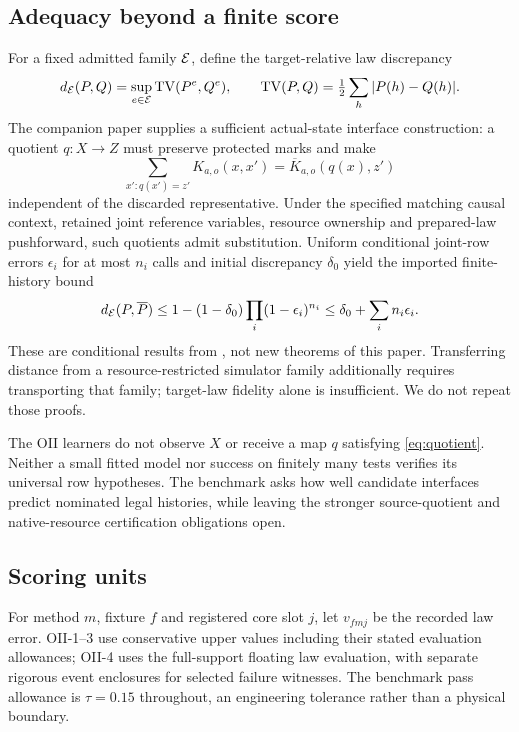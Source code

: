 \subsection{Adequacy beyond a finite score}
For a fixed admitted family $\mathcal E$, define the target-relative law discrepancy
\begin{equation}
 d_{\mathcal E}(P,Q)=\sup_{e\in\mathcal E}\operatorname{TV}(P^e,Q^e),\qquad
 \operatorname{TV}(P,Q)=\tfrac12\sum_h|P(h)-Q(h)|.
 \label{eq:legalrisk}
\end{equation}
The companion paper supplies a sufficient actual-state interface construction: a quotient $q:X\to Z$ must preserve protected marks and make
\begin{equation}
 \sum_{x':q(x')=z'}K_{a,o}(x,x')
 =\overline K_{a,o}(q(x),z')
 \label{eq:quotient}
\end{equation}
independent of the discarded representative. Under the specified matching causal context, retained joint reference variables, resource ownership and prepared-law pushforward, such quotients admit substitution. Uniform conditional joint-row errors $\epsilon_i$ for at most $n_i$ calls and initial discrepancy $\delta_0$ yield the imported finite-history bound
\begin{equation}
 d_{\mathcal E}(P,\overline P)\leq
 1-(1-\delta_0)\prod_i(1-\epsilon_i)^{n_i}
 \leq\delta_0+\sum_i n_i\epsilon_i.
 \label{eq:importbound}
\end{equation}
These are conditional results from \cite{RodgersPaper2}, not new theorems of this paper. Transferring distance from a resource-restricted simulator family additionally requires transporting that family; target-law fidelity alone is insufficient. We do not repeat those proofs.

The OII learners do not observe $X$ or receive a map $q$ satisfying \cref{eq:quotient}. Neither a small fitted model nor success on finitely many tests verifies its universal row hypotheses. The benchmark asks how well candidate interfaces predict nominated legal histories, while leaving the stronger source-quotient and native-resource certification obligations open.

\subsection{Scoring units}\label{sec:metrics}
For method $m$, fixture $f$ and registered core slot $j$, let $v_{fmj}$ be the recorded law error. OII-1--3 use conservative upper values including their stated evaluation allowances; OII-4 uses the full-support floating law evaluation, with separate rigorous event enclosures for selected failure witnesses. The benchmark pass allowance is $\tau=0.15$ throughout, an engineering tolerance rather than a physical boundary.

